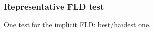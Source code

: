 \subsubsection{Representative FLD test}
\label{sec.tests.fld}

One test for the implicit FLD: best/hardest one.



